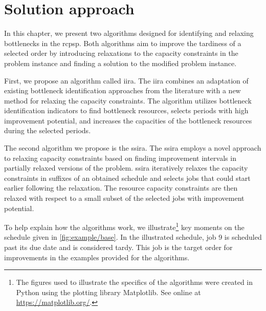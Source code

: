 \chapter{Solution approach} \label{chap:solution-apporach}

In this chapter,
we present two algorithms designed for identifying and relaxing bottlenecks in the \ac{rcpsp}.
Both algorithms aim to improve the tardiness of a selected order
by introducing relaxations to the capacity constraints in the problem instance
and finding a solution to the modified problem instance.

First, we propose an algorithm called \acf{iira}.
The \ac{iira} combines an adaptation of existing bottleneck identification approaches from the literature
with a new method for relaxing the capacity constraints.
The algorithm utilizes bottleneck identification indicators to find bottleneck resources,
selects periods with high improvement potential,
and increases the capacities of the bottleneck resources during the selected periods.

The second algorithm we propose is the \acf{ssira}.
The \ac{ssira} employs a novel approach to relaxing capacity constraints
based on finding improvement intervals in partially relaxed versions of the problem.
\ac{ssira} iteratively relaxes the capacity constraints in suffixes of an obtained schedule
and selects jobs that could start earlier following the relaxation.
The resource capacity constraints are then relaxed with respect to a small subset
of the selected jobs with improvement potential.

To help explain how the algorithms work,
we illustrate\footnote{
    The figures used to illustrate the specifics of the algorithms were created in Python
    using the plotting library Matplotlib. See online at \url{https://matplotlib.org/}.
}
key moments on the schedule given in \cref{fig:example/base}.
In the illustrated schedule, job 9 is scheduled past its due date and is considered tardy.
This job is the target order for improvements in the examples provided for the algorithms.

